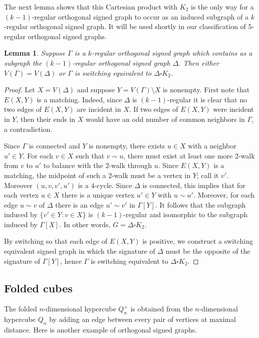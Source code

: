 \documentclass[11pt]{article}
\theoremstyle{plain}
\newtheorem{lemma}[theorem]{Lemma}
\theoremstyle{definition}
\begin{document}
The next lemma shows that this Cartesian product with $K_2$ is the only way for a $(k-1)$-regular orthogonal signed graph to occur as an induced subgraph of a $k$-regular orthogonal signed graph. It will be used shortly in our classification of $5$-regular orthogonal signed graphs.  


\begin{lemma} \label{Lem:k-1_reg_ind}
    Suppose $\Gamma$ is a $k$-regular orthogonal signed graph which contains as a subgraph the $(k-1)$-regular orthogonal signed graph $\Delta$. Then either $V(\Gamma)=V(\Delta)$ or $\Gamma$ is switching equivalent to $\Delta\square K_2$.
\end{lemma}

\begin{proof}
    Let $X=V(\Delta)$ and suppose $Y=V(\Gamma)\setminus X$ is nonempty. First note that $E(X,Y)$ is a matching. Indeed, since $\Delta$ is $(k-1)$-regular it is clear that no two edges of $E(X,Y)$ are incident in $X$. If two edges of $E(X,Y)$ were incident in $Y$, then their ends in $X$ would have an odd number of common neighbors in $\Gamma$, a contradiction.

    Since $\Gamma$ is connected and $Y$ is nonempty, there exists $u\in X$ with a neighbor $u'\in Y$. For each $v\in X$ such that $v\sim u$, there must exist at least one more 2-walk from $v$ to $u'$ to balance with the 2-walk through $u$. Since $E(X,Y)$ is a matching, the midpoint of such a 2-walk must be a vertex in $Y$; call it $v'$. Moreover $(u,v,v',u')$ is a 4-cycle. Since $\Delta$ is connected, this implies that for each vertex $u\in X$ there is a unique vertex $u'\in Y$ with $u\sim u'$. Moreover, for each edge $u\sim v$ of $\Delta$ there is an edge $u'\sim v'$ in $\Gamma[Y]$. It follows that the subgraph induced by $\{v'\in Y: v\in X\}$ is $(k-1)$-regular and isomorphic to the subgraph induced by $\Gamma[X]$. In other words, $G=\Delta\square K_2$.

    By switching so that each edge of $E(X,Y)$ is positive, we construct a switching equivalent signed graph in which the signature of $\Delta$ must be the opposite of the signature of $\Gamma[Y]$, hence $\Gamma$ is switching equivalent to $\Delta\square K_2$.
\end{proof}


\subsection{Folded cubes}

The folded $n$-dimensional hypercube $Q_n^{+}$ is obtained from the $n$-dimensional hypercube $Q_n$ by adding an edge between
every pair of vertices at maximal distance.  Here is another example of orthogonal signed graphs.
\end{document}
